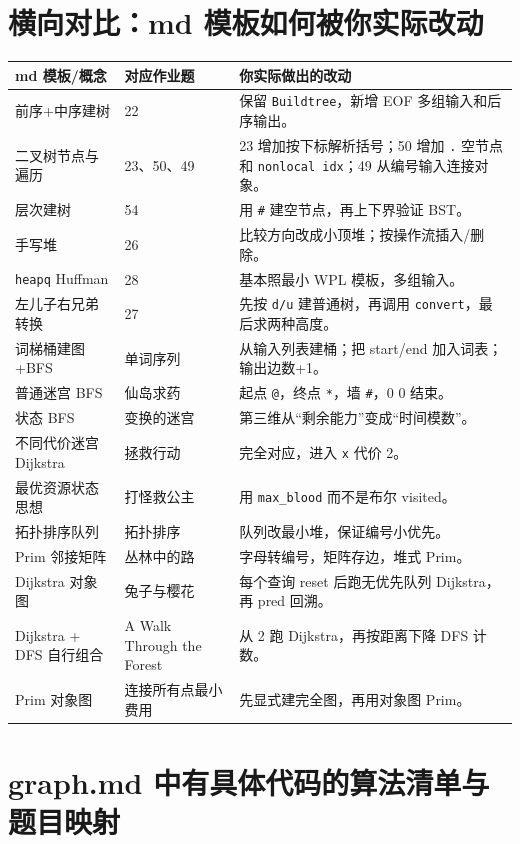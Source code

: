 \documentclass[10pt,a4paper,fontset=none]{ctexart}
\begin{document}
\section{横向对比：md 模板如何被你实际改动}

\begin{longtable}{L{3.2cm}L{4.2cm}L{6.7cm}}
\toprule
\textbf{md 模板/概念} & \textbf{对应作业题} & \textbf{你实际做出的改动} \\
\midrule
前序+中序建树 & 22 & 保留 \texttt{Buildtree}，新增 EOF 多组输入和后序输出。\\
二叉树节点与遍历 & 23、50、49 & 23 增加按下标解析括号；50 增加 \texttt{.} 空节点和 \texttt{nonlocal idx}；49 从编号输入连接对象。\\
层次建树 & 54 & 用 \texttt{\#} 建空节点，再上下界验证 BST。\\
手写堆 & 26 & 比较方向改成小顶堆；按操作流插入/删除。\\
\texttt{heapq} Huffman & 28 & 基本照最小 WPL 模板，多组输入。\\
左儿子右兄弟转换 & 27 & 先按 \texttt{d/u} 建普通树，再调用 \texttt{convert}，最后求两种高度。\\
词梯桶建图+BFS & 单词序列 & 从输入列表建桶；把 start/end 加入词表；输出边数+1。\\
普通迷宫 BFS & 仙岛求药 & 起点 \texttt{@}，终点 \texttt{*}，墙 \texttt{\#}，0 0 结束。\\
状态 BFS & 变换的迷宫 & 第三维从“剩余能力”变成“时间模数”。\\
不同代价迷宫 Dijkstra & 拯救行动 & 完全对应，进入 \texttt{x} 代价 2。\\
最优资源状态思想 & 打怪救公主 & 用 \texttt{max\_blood} 而不是布尔 visited。\\
拓扑排序队列 & 拓扑排序 & 队列改最小堆，保证编号小优先。\\
Prim 邻接矩阵 & 丛林中的路 & 字母转编号，矩阵存边，堆式 Prim。\\
Dijkstra 对象图 & 兔子与樱花 & 每个查询 reset 后跑无优先队列 Dijkstra，再 pred 回溯。\\
Dijkstra + DFS 自行组合 & A Walk Through the Forest & 从 2 跑 Dijkstra，再按距离下降 DFS 计数。\\
Prim 对象图 & 连接所有点最小费用 & 先显式建完全图，再用对象图 Prim。\\
\bottomrule
\end{longtable}

\section{graph.md 中有具体代码的算法清单与题目映射}
\end{document}
